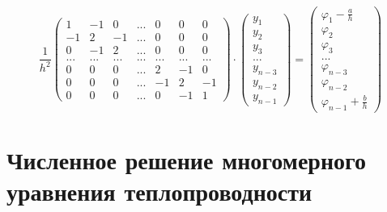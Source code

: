 \documentclass[9pt]{article}
\begin{document}
\[\dfrac{1}{h^2}\left(
\begin{array}{ccccccc}
    1 & -1 & 0 & ... & 0 & 0 & 0 \\
    -1 & 2 & -1 & ... & 0 & 0 & 0 \\
    0 & -1 & 2 & ... & 0 & 0 & 0 \\
    ... & ... & ... & ... & ... & ... & ... \\
    0 & 0 & 0 & ... & 2 & -1 & 0 \\
    0 & 0 & 0 & ... & -1 & 2 & -1 \\
    0 & 0 & 0 & ... & 0 & -1 & 1
\end{array}
\right)\cdot\left(
\begin{array}{c}
    y_1 \\ y_2 \\ y_3 \\ ... \\ y_{n-3} \\ y_{n-2} \\ y_{n-1}
\end{array}
\right)=\left(
\begin{array}{c}
    \varphi_1-\frac{a}{h} \\
    \varphi_2 \\ \varphi_3 \\ ... \\ \varphi_{n-3} \\ \varphi_{n-2} \\
    \varphi_{n-1}+\frac{b}{h}
\end{array}
\right)\]

\section{Численное решение многомерного уравнения теплопроводности}
\end{document}
